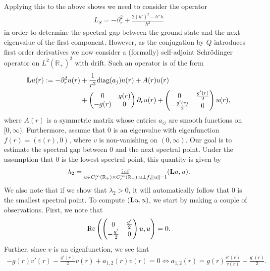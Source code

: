 \documentclass[11pt,reqno]{amsart}
\theoremstyle{remark}
\newcommand{\R}{\mathbb{R}}
\newcommand{\Lf}{\textup{\textbf{L}}}
\renewcommand{\Re}{\textup{Re}}
\theoremstyle{definition}
\begin{document}
Applying this to the above shows we need to consider the operator 
\begin{align*}
	L_S = - \partial_r^2 + \frac{2(h')^2 - h'' h}{h^2}
\end{align*}
in order to determine the spectral gap between the ground state and the next eigenvalue of the first component.  
 However, as the conjugation by $Q$ introduces first order derivatives we now consider a (formally) self-adjoint Schrödinger operator on $L^2(\R_+)^2$ with drift. Such an operator is of the form 
\begin{align*} \Lf u(r) :=
    -\partial_r^2 u(r) &+ \frac1{r^2}\text{diag}(a_j)u(r)+A(r) u(r) \\
    &+ \begin{pmatrix}
        0 & g(r)
        \\
        -g(r) &0
    \end{pmatrix}\partial_r u(r)
+
    \begin{pmatrix}
        0 & \frac{g'(r)}{2}
        \\
        -\frac{g'(r)}{2} &0
    \end{pmatrix} u(r),
\end{align*}
where $A(r)$ is a symmetric matrix whose entries $a_{ij}$ are smooth functions on $[0,\infty).$
Furthermore, assume that $0$ is an eigenvalue with eigenfunction $f(r)=(v(r),0)$, where $v$ is non-vanishing on $(0,\infty)$. Our goal is to estimate the spectral gap between $0$ and the next spectral point. Under the assumption that $0$ is the lowest spectral point, this quantity is given by \begin{align*}
    \lambda_2=\inf_{u\in C^\infty_c(\R_+)\times C^\infty_c(\R_+): u\perp f, \|u\|=1} (\Lf u,u). 
\end{align*}
We also note that if we show that $\lambda_2>0$, it will automatically follow that 0 is the smallest spectral point.
To compute $(\Lf u,u)$, we start by making a couple of observations. 
First, we note that
\begin{align*}
  \Re\left(  \begin{pmatrix}
        0 & \frac{g'}{2}
        \\
        -\frac{g'}{2} &0
    \end{pmatrix}u,u\right)=0.
\end{align*}
Further, since $v$ is an eigenfunction, we see that 
\begin{align*}
    -g(r) v'(r)-\frac{g'(r)}2 v(r) +a_{1,2}(r)v(r)=0  \iff  a_{1,2}(r)=g(r)\frac{v'(r)}{v(r)}+\frac{g'(r)}2.
\end{align*}
\end{document}

